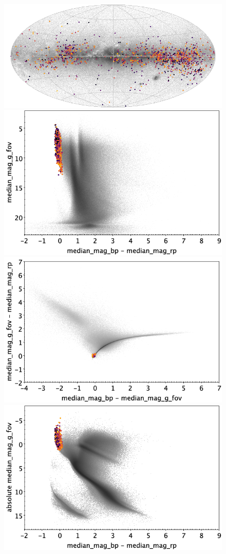 \documentclass[longauth]{aa}
\begin{document}
\begin{appendix}
\begin{figure}
\centering
{}
\includegraphics[width=0.6\hsize]{figures/appendix/SPB_cls_sky.png} 
 \\ %
\vspace{4mm}
 \includegraphics[width=0.45\hsize]{figures/appendix/SPB_cls_cm.png}  %
\hspace{2mm}
 \includegraphics[width=0.45\hsize]{figures/appendix/SPB_cls_cc.png} \\ %
\vspace{4mm}
 \includegraphics[width=0.45\hsize]{figures/appendix/SPB_cls_cam.png}  %

\end{figure}
\end{appendix}
\end{document}
